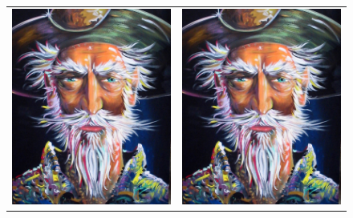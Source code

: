 \documentclass{book}
\begin{document}
\begin{figure}[t]
\centering
\begin{tabular}{cc}
\label{quijote}
\includegraphics[scale=0.5, angle=60, trim={4cm 4cm 4cm 4cm}, clip]{quijote} & \qquad\qquad\qquad\qquad\includegraphics[scale=0.5, angle=40, trim={2cm 4cm 2cm 4cm}, clip]{quijote}

\end{tabular}
\end{figure}
\end{document}

